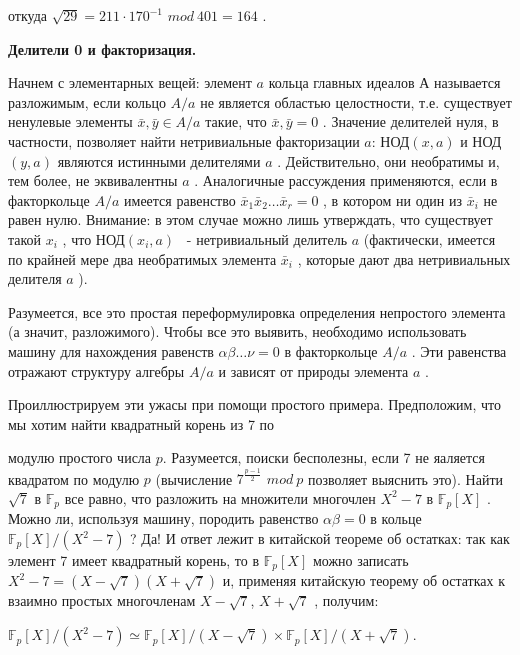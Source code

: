 откуда $\sqrt{29}=211\cdot 170^{-1}$ $mod \ 401=164$
.


{\bf Делители 0 и факторизация.}

Начнем с элементарных вещей: элемент $a$
 кольца главных идеалов $А$ называется разложимым, если кольцо $A/a$
 не является областью целостности, т.е. существует ненулевые элементы $\bar x,\bar y\in A/ a$
 такие, что $\bar x,\bar y = 0$
 . Значение делителей нуля, в частности, позволяет найти нетривиальные факторизации $a$: НОД$(x,a)$
 и НОД$(y,a)$
 являются истинными делителями $a$
 . Действительно, они необратимы и, тем более, не эквивалентны $a$
. Аналогичные рассуждения применяются, если в факторкольце $A/a$
 имеется равенство $\bar x_1\bar x_2\ldots \bar x_r = 0$
 , в котором ни один из $\bar x_i$
 не равен нулю. Внимание: в этом случае можно лишь утверждать, что существует такой $x_i$
 , что НОД$(x_i,a)$
 ~- нетривиальный делитель $a$
 (фактически, имеется по крайней мере два необратимых элемента $\bar x_i$
    , которые дают два нетривиальных делителя $a$
).

Разумеется, все это простая переформулировка определения непростого элемента (а значит, разложимого). Чтобы все это выявить, необходимо использовать машину для нахождения равенств $\alpha\beta\ldots\nu=0$
 в факторкольце $A/a$
 . Эти равенства отражают структуру алгебры $A/a$
 и зависят от природы элемента $a$
 .

Проиллюстрируем эти ужасы при помощи простого примера. Предположим, что мы хотим найти квадратный корень из 7 по

\newpage

модулю простого числа $p$. Разумеется, поиски бесполезны, если 7 не яаляется квадратом по модулю $p$ (вычисление $7^{\frac{p-1}{2}}$ $mod \ p$
 позволяет выяснить это). Найти $\sqrt 7$
 в $\mathbb{F}_p$
 все равно, что разложить на множители многочлен $X^2 - 7$
 в $\mathbb{F}_p[X]$
 . Можно ли, используя машину, породить равенство $\alpha\beta=0$
 в кольце $\mathbb{F}_p[X]/(X^2 - 7)$
 ? Да! И ответ лежит в китайской теореме об остатках: так как элемент 7 имеет квадратный корень, то в $\mathbb{F}_p[X]$
 можно записать $X^2 - 7 = (X-\sqrt 7)(X+\sqrt 7)$
 и, применяя китайскую теорему об остатках к взаимно простых многочленам $X - \sqrt 7$, $X+\sqrt 7$
 , получим:

\begin{center}
$\mathbb{F}_p[X]/(X^2 - 7)\simeq \mathbb{F}_p[X]/(X-\sqrt 7)\times\mathbb{F}_p[X]/(X+\sqrt 7)$.
\end{center}


